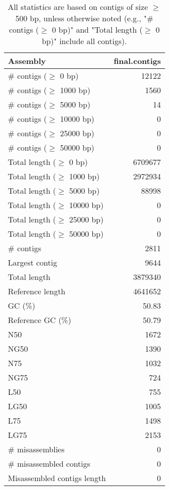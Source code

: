 \documentclass[12pt,a4paper]{article}
\begin{document}
\begin{table}[ht]
\begin{center}
\caption{All statistics are based on contigs of size $\geq$ 500 bp, unless otherwise noted (e.g., "\# contigs ($\geq$ 0 bp)" and "Total length ($\geq$ 0 bp)" include all contigs).}
\begin{tabular}{|l*{1}{|r}|}
\hline
Assembly & final.contigs \\ \hline
\# contigs ($\geq$ 0 bp) & 12122 \\ \hline
\# contigs ($\geq$ 1000 bp) & 1560 \\ \hline
\# contigs ($\geq$ 5000 bp) & 14 \\ \hline
\# contigs ($\geq$ 10000 bp) & 0 \\ \hline
\# contigs ($\geq$ 25000 bp) & 0 \\ \hline
\# contigs ($\geq$ 50000 bp) & 0 \\ \hline
Total length ($\geq$ 0 bp) & 6709677 \\ \hline
Total length ($\geq$ 1000 bp) & 2972934 \\ \hline
Total length ($\geq$ 5000 bp) & 88998 \\ \hline
Total length ($\geq$ 10000 bp) & 0 \\ \hline
Total length ($\geq$ 25000 bp) & 0 \\ \hline
Total length ($\geq$ 50000 bp) & 0 \\ \hline
\# contigs & 2811 \\ \hline
Largest contig & 9644 \\ \hline
Total length & 3879340 \\ \hline
Reference length & 4641652 \\ \hline
GC (\%) & 50.83 \\ \hline
Reference GC (\%) & 50.79 \\ \hline
N50 & 1672 \\ \hline
NG50 & 1390 \\ \hline
N75 & 1032 \\ \hline
NG75 & 724 \\ \hline
L50 & 755 \\ \hline
LG50 & 1005 \\ \hline
L75 & 1498 \\ \hline
LG75 & 2153 \\ \hline
\# misassemblies & 0 \\ \hline
\# misassembled contigs & 0 \\ \hline
Misassembled contigs length & 0 \\ \hline

\end{tabular}
\end{center}
\end{table}
\end{document}

